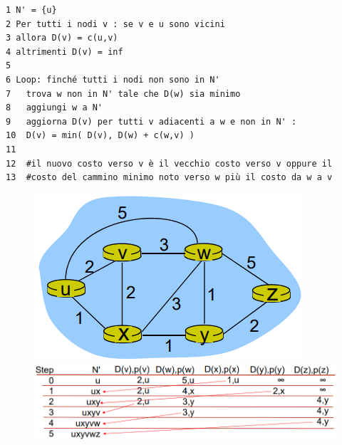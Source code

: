 \documentclass[11pt,a4paper,oneside]{book}
\theoremstyle{definition}
\begin{document}
\pagebreak

\begin{verbatim}
1 N' = {u}
2 Per tutti i nodi v : se v e u sono vicini
3 allora D(v) = c(u,v)
4 altrimenti D(v) = inf
5
6 Loop: finché tutti i nodi non sono in N'
7 	trova w non in N' tale che D(w) sia minimo
8 	aggiungi w a N'
9 	aggiorna D(v) per tutti v adiacenti a w e non in N' :
10 	D(v) = min( D(v), D(w) + c(w,v) )
11
12 	#il nuovo costo verso v è il vecchio costo verso v oppure il
13 	#costo del cammino minimo noto verso w più il costo da w a v 
\end{verbatim}
\begin{figure}[!h]
	\centering
	\includegraphics[scale=0.3]{Immagini/Dk2.png}
	\includegraphics[scale=0.3]{Immagini/Dk.png}
\end{figure}
\end{document}
